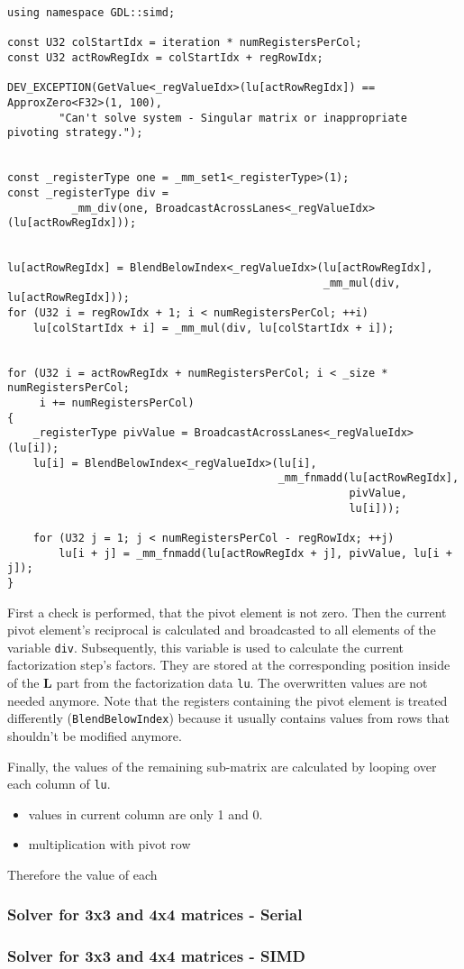 \begin{verbatim}
using namespace GDL::simd;

const U32 colStartIdx = iteration * numRegistersPerCol;
const U32 actRowRegIdx = colStartIdx + regRowIdx;

DEV_EXCEPTION(GetValue<_regValueIdx>(lu[actRowRegIdx]) == ApproxZero<F32>(1, 100),
        "Can't solve system - Singular matrix or inappropriate pivoting strategy.");


const _registerType one = _mm_set1<_registerType>(1);
const _registerType div = 
          _mm_div(one, BroadcastAcrossLanes<_regValueIdx>(lu[actRowRegIdx]));


lu[actRowRegIdx] = BlendBelowIndex<_regValueIdx>(lu[actRowRegIdx],
                                                 _mm_mul(div, lu[actRowRegIdx]));
for (U32 i = regRowIdx + 1; i < numRegistersPerCol; ++i)
    lu[colStartIdx + i] = _mm_mul(div, lu[colStartIdx + i]);


for (U32 i = actRowRegIdx + numRegistersPerCol; i < _size * numRegistersPerCol;
     i += numRegistersPerCol)
{
    _registerType pivValue = BroadcastAcrossLanes<_regValueIdx>(lu[i]);
    lu[i] = BlendBelowIndex<_regValueIdx>(lu[i], 
                                          _mm_fnmadd(lu[actRowRegIdx], 
                                                     pivValue, 
                                                     lu[i]));
    
    for (U32 j = 1; j < numRegistersPerCol - regRowIdx; ++j)
        lu[i + j] = _mm_fnmadd(lu[actRowRegIdx + j], pivValue, lu[i + j]);
}
\end{verbatim}

First a check is performed, that the pivot element is not zero.
Then the current pivot element's reciprocal is calculated and broadcasted to all elements of the variable \texttt{div}.
Subsequently, this variable is used to calculate the current factorization step's factors.
They are stored at the corresponding position inside of the $\mathbf{L}$ part from the factorization data \texttt{lu}.
The overwritten values are not needed anymore.
Note that the registers containing the pivot element is treated differently (\texttt{BlendBelowIndex}) because it usually contains values from rows that shouldn't be modified anymore.

Finally, the values of the remaining sub-matrix are calculated by looping over each column of \texttt{lu}.

\begin{itemize}
\item values in current column are only 1 and 0.
\item multiplication with pivot row
\end{itemize}
Therefore the value of each 






\newpage
\subsubsection{Solver for 3x3 and 4x4 matrices - Serial}
\subsubsection{Solver for 3x3 and 4x4 matrices - SIMD}